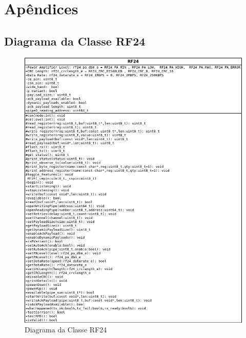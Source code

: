 \chapter{Apêndices}

 \section{Diagrama da Classe RF24}
  \begin{figure}[H]
    \centering
    \includegraphics[width=\linewidth]{../../Imagens/RF24_class.png}
    \caption{Diagrama da Classe RF24} %
    \label{RF24_ClassDiag}
  \end{figure}


